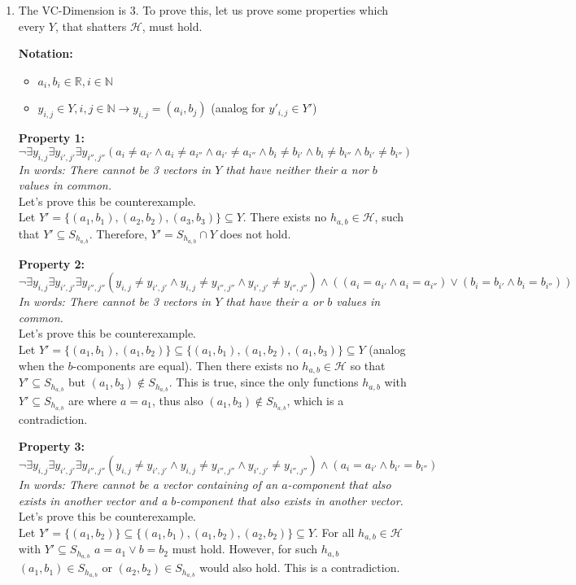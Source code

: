 \documentclass[12pt]{article}
\begin{document}
\begin{enumerate}[label=(\alph*)]
	\item	The VC-Dimension is $3$. To prove this, let us prove some properties which every $Y$, that shatters $\mathcal{H}$, must hold.

			\textbf{Notation:}
			\begin{itemize}
				\item	$a_i, b_i \in \mathbb{R}, i \in \mathbb{N}$
				\item	$y_{i,j} \in Y , i,j \in \mathbb{N} \rightarrow y_{i,j} = (a_i, b_j)$ (analog for $y'_{i,j} \in Y'$)
			\end{itemize}

			\textbf{Property 1:}
			$$\neg \exists y_{i, j} \exists y_{i', j'} \exists y_{i'', j''} (a_i \neq a_{i'} \land a_i \neq a_{i''} \land a_{i'} \neq a_{i''} \land b_i \neq b_{i'} \land b_i \neq b_{i''} \land b_{i'} \neq b_{i''})$$
			\textit{In words: There cannot be 3 vectors in $Y$ that have neither their $a$ nor $b$ values in common.} \\
			Let's prove this be counterexample. \\
			Let $Y' = \{(a_1, b_1), (a_2, b_2), (a_3, b_3)\} \subseteq Y$. There exists no $h_{a,b} \in \mathcal{H}$, such that $Y' \subseteq S_{h_{a,b}}$. Therefore, $Y' = S_{h_{a,b}} \cap Y$ does not hold.

			\textbf{Property 2:}
			$$\neg \exists y_{i, j} \exists y_{i', j'} \exists y_{i'', j''} (y_{i,j} \neq y_{i',j'} \land y_{i,j} \neq y_{i'',j''} \land y_{i',j'} \neq y_{i'',j''}) \land ((a_i = a_{i'} \land a_i = a_{i''}) \lor (b_i = b_{i'} \land b_i = b_{i''}))$$
			\textit{In words: There cannot be 3 vectors in $Y$ that have their $a$ or $b$ values in common.} \\
			Let's prove this be counterexample. \\
			Let $Y' = \{(a_1, b_1), (a_1, b_2)\} \subseteq \{(a_1, b_1), (a_1, b_2), (a_1, b_3)\} \subseteq Y$ (analog when the $b$-components are equal). Then there exists no $h_{a,b} \in \mathcal{H}$ so that $Y' \subseteq S_{h_{a,b}}$ but $(a_1, b_3) \not\in S_{h_{a,b}}$. This is true, since the only functions $h_{a,b}$ with $Y' \subseteq S_{h_{a,b}}$ are where $a = a_1$, thus also $(a_1, b_3) \not\in S_{h_{a,b}}$, which is a contradiction.

			\textbf{Property 3:}
			$$\neg \exists y_{i, j} \exists y_{i', j'} \exists y_{i'', j''} (y_{i,j} \neq y_{i',j'} \land y_{i,j} \neq y_{i'',j''} \land y_{i',j'} \neq y_{i'',j''}) \land (a_i = a_{i'} \land b_{i'} = b_{i''})$$
			\textit{In words: There cannot be a vector containing of an $a$-component that also exists in another vector and a $b$-component that also exists in another vector.} \\
			Let's prove this be counterexample. \\
			Let $Y' = \{(a_1, b_2)\} \subseteq \{(a_1, b_1), (a_1, b_2), (a_2, b_2)\} \subseteq Y$.
			For all $h_{a,b} \in \mathcal{H}$ with $Y' \subseteq S_{h_{a,b}}$ $a=a_1 \lor b=b_2$ must hold. However, for such $h_{a,b}$ $(a_1, b_1) \in S_{h_{a,b}}$ or $(a_2, b_2) \in S_{h_{a,b}}$ would also hold. This is a contradiction.


\end{enumerate}
\end{document}
